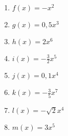 \newpage
\begin{Exercise}[title={Skizziere das Schaubild, gib die Symmetrie sowie das Verhalten für sehr große/kleine \(x\) an.}, label=potenzA1]\\
	\begin{minipage}{\textwidth}
		\begin{minipage}{0.49\textwidth}
			\begin{enumerate}[label=\alph*)]
				\item \(f(x)=-x^2\)
				\item \(g(x)=0,5x^3\)
				\item \(h(x)=2x^6\)
				\item \(i(x)=-\frac{3}{2}x^5\)
			\end{enumerate}
		\end{minipage}
		\begin{minipage}{0.49\textwidth}
			\begin{enumerate}[label=\alph*)]
				\setcounter{enumi}{4}
				\item \(j(x)=0,1x^4\)
				\item \(k(x)=-\frac{3}{5}x^7\)
				\item \(l(x)=-\sqrt{2}x^4\)
				\item \(m(x)=3x^5\)
			\end{enumerate}
		\end{minipage}
	\end{minipage}
\end{Exercise}
\newpage
